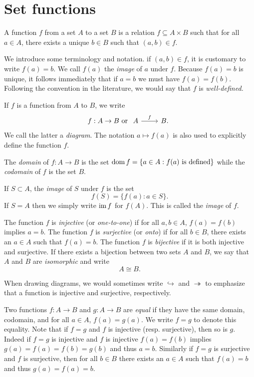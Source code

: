 \section{Set functions}
\label{sec:set-functions}

\begin{definition}
    A function \(f\) from a set \(A\) to a set \(B\) is a relation \(f \subseteq
    A \times B\) such that for all \(a \in A\), there exists a unique \(b \in
    B\) such that \((a, b) \in f\).
\end{definition}

We introduce some terminology and notation. if \((a, b) \in f\), it is customary
to write \(f(a) = b\). We call \(f(a)\) the \emph{image} of \(a\) under \(f\).
Because \(f(a) = b\) is unique, it follows immediately that if \(a = b\) we must
have \(f(a) = f(b)\). Following the convention in the literature, we would say
that \(f\) is \emph{well-defined.}

If \(f\) is a function from \(A\) to \(B\), we write
\[
    f: A \to B \text{ or } \begin{tikzcd}
        A \arrow[r, "f"] & B.
    \end{tikzcd}
\]
We call the latter a \emph{diagram}. The notation \(a \mapsto f(a)\) is also
used to explicitly define the function \(f\).

The \emph{domain} of \(f : A \to B\) is the set \(\operatorname{dom} f = \{a \in A : f(a)
\text{ is defined}\}\) while the \emph{codomain} of \(f\) is the set \(B\). 

If \(S \subset A\), the \emph{image} of \(S\) under \(f\) is the set
\[
    f(S) = \{f(a) : a \in S\}.
\]
If \(S = A\) then we simply write \(\operatorname{im} f\) for \(f(A)\). This is called the
\emph{image} of \(f\).


The function \(f\) is \emph{injective} (or \emph{one-to-one}) if for all \(a, b
\in A\), \(f(a) = f(b)\) implies \(a = b\). The function \(f\) is
\emph{surjective} (or \emph{onto}) if for all \(b \in B\), there exists an \(a
\in A\) such that \(f(a) = b\). The function \(f\) is \emph{bijective} if it is
both injective and surjective. If there exists a bijection between two sets
\(A\) and \(B\), we say that \(A\) and \(B\) are \emph{isomorphic} and write
\[
    A \cong B.
\]

When drawing diagrams, we would sometimes write \(\hookrightarrow\) and
\(\twoheadrightarrow\) to emphasize that a function is injective and surjective,
respectively.

Two functions \(f: A \to B\) and \(g: A \to B\) are \emph{equal} if they have
the same domain, codomain, and for all \(a \in A\), \(f(a) = g(a)\). We write
\(f = g\) to denote this equality. Note that if \(f = g\) and \(f\) is injective
(resp. surjective), then so is \(g\). Indeed if \(f = g\) is injective and \(f\)
is injective \(f(a) = f(b)\) implies \(g(a) = f(a) = f(b) = g(b)\) and thus \(a
= b\). Similarly if \(f = g\) is surjective and \(f\) is surjective, then for
all \(b \in B\) there exists an \(a \in A\) such that \(f(a) = b\) and thus
\(g(a) = f(a) = b\).

